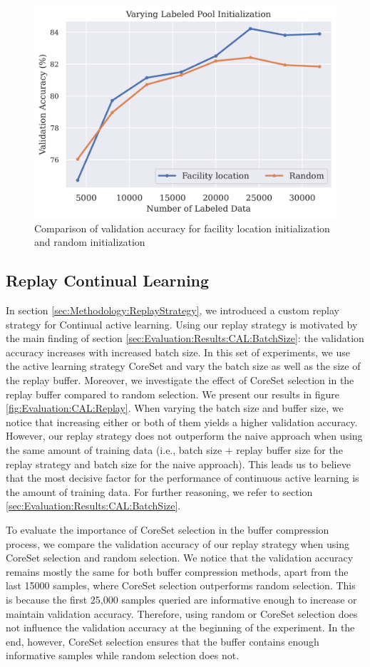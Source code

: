 \begin{figure}[h]
    \centering
    \includegraphics[width=0.6\linewidth]{images/results_CAL/Facility_location_init.png}
    \caption{Comparison of validation accuracy for facility location initialization and random initialization}
    \label{fig:Evaluation:CAL:FLinit}
\end{figure}


\subsection{Replay Continual Learning}
\label{sec:Evaluation:CAL:Replay}
In section \ref{sec:Methodology:ReplayStrategy}, we introduced a custom replay strategy for Continual active learning. Using our replay strategy is motivated by the main
finding of section \ref{sec:Evaluation:Results:CAL:BatchSize}: the validation accuracy increases with increased batch size. In this set of experiments, we use the active
learning strategy CoreSet and vary the batch size as well as the size of the replay buffer. Moreover, we investigate the effect of CoreSet selection in the replay buffer
compared to random selection. We present our results in figure \ref{fig:Evaluation:CAL:Replay}. When varying the batch size and buffer size, we notice that increasing either
or both of them yields a higher validation accuracy. However, our replay strategy does not outperform the naive approach when using the same amount of training data
(i.e., batch size + replay buffer size for the replay strategy and batch size for the naive approach). This leads us to believe that the most decisive factor for the performance
of continuous active learning is the amount of training data. For further reasoning, we refer to section \ref{sec:Evaluation:Results:CAL:BatchSize}. \par
To evaluate the importance of CoreSet selection in the buffer compression process, we compare the validation accuracy of our replay strategy when using CoreSet selection and
random selection. We notice that the validation accuracy remains mostly the same for both buffer compression methods, apart from the last 15000 samples, where CoreSet selection
outperforms random selection. This is because the first 25,000 samples queried are informative enough to increase or maintain validation accuracy. Therefore, using random or
CoreSet selection does not influence the validation accuracy at the beginning of the experiment. In the end, however, CoreSet selection ensures that the buffer contains
enough informative samples while random selection does not. \par


